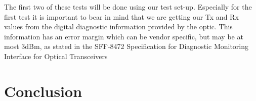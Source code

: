 \documentclass{article}
\begin{document}
The first two of these tests will be done using our test set-up.
Especially for the first test it is important to bear in mind that we are getting our Tx and Rx values from the digital diagnostic information provided by the optic.
This information has an error margin which can be vendor specific, but may be at most 3dBm, as stated in the SFF-8472 Specification for
Diagnostic Monitoring Interface for Optical Transceivers\cite{SFF:DDM}






\newpage
\section{Conclusion}


\end{document}
